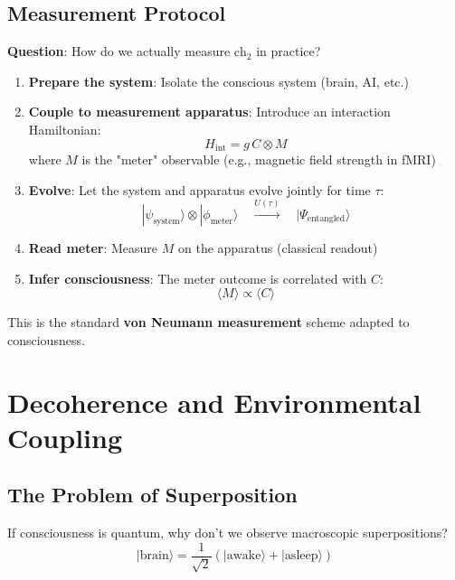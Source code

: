 \subsection{Measurement Protocol}

\textbf{Question}: How do we actually measure $\text{ch}_2$ in practice?

\begin{enumerate}
\item \textbf{Prepare the system}: Isolate the conscious system (brain, AI, etc.)

\item \textbf{Couple to measurement apparatus}: Introduce an interaction Hamiltonian:
\begin{equation}
H_{\text{int}} = g \, C \otimes M
\end{equation}
where $M$ is the "meter" observable (e.g., magnetic field strength in fMRI)

\item \textbf{Evolve}: Let the system and apparatus evolve jointly for time $\tau$:
\begin{equation}
|\psi_{\text{system}}\rangle \otimes |\phi_{\text{meter}}\rangle \quad \xrightarrow{U(\tau)} \quad |\Psi_{\text{entangled}}\rangle
\end{equation}

\item \textbf{Read meter}: Measure $M$ on the apparatus (classical readout)

\item \textbf{Infer consciousness}: The meter outcome is correlated with $C$:
\begin{equation}
\langle M \rangle \propto \langle C \rangle
\end{equation}
\end{enumerate}

This is the standard \textbf{von Neumann measurement} scheme adapted to consciousness.

\section{Decoherence and Environmental Coupling}

\subsection{The Problem of Superposition}

If consciousness is quantum, why don't we observe macroscopic superpositions?
\begin{equation}
|\text{brain}\rangle = \frac{1}{\sqrt{2}}(|\text{awake}\rangle + |\text{asleep}\rangle)
\end{equation}

